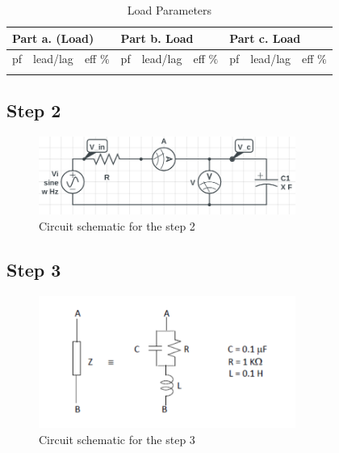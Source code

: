 \documentclass[letterpaper,12pt]{article}
\begin{document}
\begin{table}[H]
  \begin{center}
    \caption{Load Parameters}
    \vspace{2mm}
 \begin{tabular}{||lll|lll|lll||}
    \hline
    \multicolumn{3}{|l|}{Part a. (Load)}                            & \multicolumn{3}{l|}{Part b. Load}                            & \multicolumn{3}{l|}{Part c. Load}                            \\ \hline
    \multicolumn{1}{|l|}{pf} & \multicolumn{1}{l|}{lead/lag} & eff \(\%\) & \multicolumn{1}{l|}{pf} & \multicolumn{1}{l|}{lead/lag} &eff \(\%\)  & \multicolumn{1}{l|}{pf} & \multicolumn{1}{l|}{lead/lag} &eff \(\%\)  \\ \hline
    \multicolumn{1}{|l|}{} & \multicolumn{1}{l|}{} &  & \multicolumn{1}{l|}{} & \multicolumn{1}{l|}{} &  & \multicolumn{1}{l|}{} & \multicolumn{1}{l|}{} &  \\ \hline
    \end{tabular}
\end{center}

\end{table}
\subsection{Step 2}
\begin{figure}[H]
    \centering
    \includegraphics[width = 0.75\textwidth]{2SCH.png}
    \caption{Circuit schematic for the step 2}
\end{figure} 
    
\subsection{Step 3}
\begin{figure}[H]
    \centering
    \includegraphics[width = 0.75\textwidth]{3SCH.png}
    \caption{Circuit schematic for the step 3}
\end{figure} 
\end{document}
